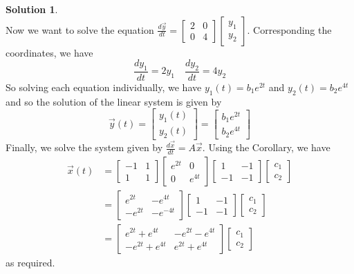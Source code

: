 \documentclass[11pt]{article}
\theoremstyle{definition}\newtheorem{definition}{Definition}
\theoremstyle{definition}\newtheorem{question}{Question}
\theoremstyle{definition}\newtheorem*{solution}{Solution}
\theoremstyle{definition}\newtheorem{example}{Example}
\theoremstyle{definition}\newtheorem{notation}{Notation}
\theoremstyle{theorem}\newtheorem{theorem}{Theorem}
\theoremstyle{theorem}\newtheorem{corollary}{Corollary}
\theoremstyle{theorem}\newtheorem{lemma}{Lemma}
\theoremstyle{theorem}\newtheorem{proposition}{Proposition}
\begin{document}
\begin{solution}
\begin{equation*}
    \end{equation*}
    Now we want to solve the equation $\frac{d\vec{y}}{dt} = \begin{bmatrix} 2 & 0 \\ 0 & 4 \end{bmatrix}\begin{bmatrix} y_1 \\ y_2 \end{bmatrix}$. Corresponding the coordinates, we have
    \begin{equation*}
        \frac{dy_1}{dt} = 2y_1 \quad \frac{dy_2}{dt} = 4y_2
    \end{equation*}
    So solving each equation individually, we have $y_1(t) = b_1e^{2t}$ and $y_2(t) = b_2e^{4t}$ and so the solution of the linear system is given by
    \begin{equation*}
        \vec{y}(t) = \begin{bmatrix} y_1(t) \\ y_2(t) \end{bmatrix} = \begin{bmatrix} b_1e^{2t} \\ b_2e^{4t} \end{bmatrix}
    \end{equation*}
    Finally, we solve the system given by $\frac{d\vec{x}}{dt} = A\vec{x}$. Using the Corollary, we have
    \begin{align*}
        \vec{x}(t) &= \begin{bmatrix} -1 & 1 \\ 1 & 1 \end{bmatrix}\begin{bmatrix} e^{2t} & 0 \\ 0 & e^{4t} \end{bmatrix} \begin{bmatrix} 1 & -1 \\ -1 & -1 \end{bmatrix}\begin{bmatrix} c_1 \\ c_2 \end{bmatrix} \\
        &= \begin{bmatrix} e^{2t} & -e^{4t} \\ -e^{2t} & -e^{-4t} \end{bmatrix} \begin{bmatrix} 1 & -1 \\ -1 & -1 \end{bmatrix} \begin{bmatrix} c_1 \\ c_2 \end{bmatrix} \\
        &= \begin{bmatrix} e^{2t} + e^{4t} & -e^{2t} - e^{4t} \\ -e^{2t} + e^{4t} & e^{2t} + e^{4t} \end{bmatrix} \begin{bmatrix} c_1 \\ c_2 \end{bmatrix}
    \end{align*}
    as required.


\end{solution}
\end{document}
